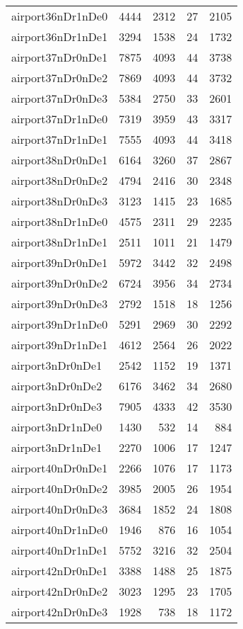 \begin{longtable}{lrrrr}
airport36nDr1nDe0 & 4444 & 2312 & 27 & 2105 \\
airport36nDr1nDe1 & 3294 & 1538 & 24 & 1732 \\
airport37nDr0nDe1 & 7875 & 4093 & 44 & 3738 \\
airport37nDr0nDe2 & 7869 & 4093 & 44 & 3732 \\
airport37nDr0nDe3 & 5384 & 2750 & 33 & 2601 \\
airport37nDr1nDe0 & 7319 & 3959 & 43 & 3317 \\
airport37nDr1nDe1 & 7555 & 4093 & 44 & 3418 \\
airport38nDr0nDe1 & 6164 & 3260 & 37 & 2867 \\
airport38nDr0nDe2 & 4794 & 2416 & 30 & 2348 \\
airport38nDr0nDe3 & 3123 & 1415 & 23 & 1685 \\
airport38nDr1nDe0 & 4575 & 2311 & 29 & 2235 \\
airport38nDr1nDe1 & 2511 & 1011 & 21 & 1479 \\
airport39nDr0nDe1 & 5972 & 3442 & 32 & 2498 \\
airport39nDr0nDe2 & 6724 & 3956 & 34 & 2734 \\
airport39nDr0nDe3 & 2792 & 1518 & 18 & 1256 \\
airport39nDr1nDe0 & 5291 & 2969 & 30 & 2292 \\
airport39nDr1nDe1 & 4612 & 2564 & 26 & 2022 \\
airport3nDr0nDe1 & 2542 & 1152 & 19 & 1371 \\
airport3nDr0nDe2 & 6176 & 3462 & 34 & 2680 \\
airport3nDr0nDe3 & 7905 & 4333 & 42 & 3530 \\
airport3nDr1nDe0 & 1430 & 532 & 14 & 884 \\
airport3nDr1nDe1 & 2270 & 1006 & 17 & 1247 \\
airport40nDr0nDe1 & 2266 & 1076 & 17 & 1173 \\
airport40nDr0nDe2 & 3985 & 2005 & 26 & 1954 \\
airport40nDr0nDe3 & 3684 & 1852 & 24 & 1808 \\
airport40nDr1nDe0 & 1946 & 876 & 16 & 1054 \\
airport40nDr1nDe1 & 5752 & 3216 & 32 & 2504 \\
airport42nDr0nDe1 & 3388 & 1488 & 25 & 1875 \\
airport42nDr0nDe2 & 3023 & 1295 & 23 & 1705 \\
airport42nDr0nDe3 & 1928 & 738 & 18 & 1172 \\

\end{longtable}
